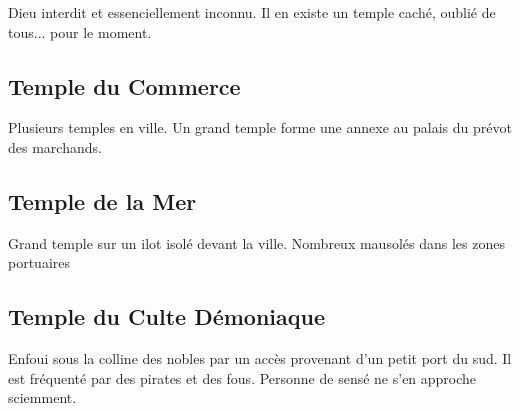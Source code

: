 Dieu interdit et essenciellement inconnu. Il en existe un temple caché, oublié de tous... pour le moment.

\subsection{Temple du Commerce}

Plusieurs temples en ville. Un grand temple forme une annexe au palais du prévot des marchands.

\subsection{Temple de la Mer}

Grand temple sur un ilot isolé devant la ville. Nombreux mausolés dans les zones portuaires

\subsection{Temple du Culte Démoniaque}

Enfoui sous la colline des nobles par un accès provenant d'un petit port du sud. Il est fréquenté par des pirates et des fous. Personne de sensé ne s'en approche sciemment.
